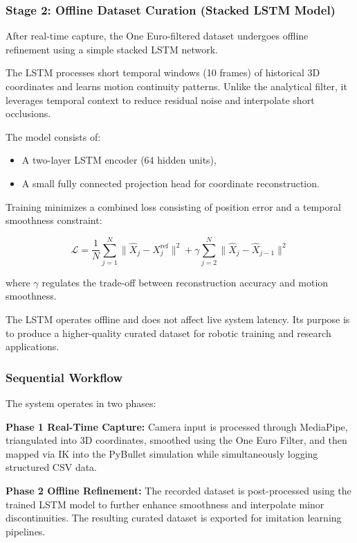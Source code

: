 \subsubsection{Stage 2: Offline Dataset Curation (Stacked LSTM Model)}

After real-time capture, the One Euro-filtered dataset undergoes 
offline refinement using a simple stacked LSTM network.

The LSTM processes short temporal windows (10 frames) of historical 
3D coordinates and learns motion continuity patterns. 
Unlike the analytical filter, it leverages temporal context to 
reduce residual noise and interpolate short occlusions.

The model consists of:
\begin{itemize}
    \item A two-layer LSTM encoder (64 hidden units),
    \item A small fully connected projection head for coordinate reconstruction.
\end{itemize}

Training minimizes a combined loss consisting of position error 
and a temporal smoothness constraint:

\begin{equation}
\mathcal{L} =
\frac{1}{N} \sum_{j=1}^{N} \|\hat{X}_j - X_j^{\text{ref}}\|^2
+
\gamma \sum_{j=2}^{N} \|\hat{X}_j - \hat{X}_{j-1}\|^2
\end{equation}

where $\gamma$ regulates the trade-off between reconstruction accuracy 
and motion smoothness.

The LSTM operates offline and does not affect live system latency. 
Its purpose is to produce a higher-quality curated dataset for 
robotic training and research applications.

\subsubsection{Sequential Workflow}

The system operates in two phases:

\textbf{Phase 1  Real-Time Capture:}  
Camera input is processed through MediaPipe, triangulated into 3D coordinates, 
smoothed using the One Euro Filter, and then mapped via IK into the PyBullet 
simulation while simultaneously logging structured CSV data.

\textbf{Phase 2  Offline Refinement:}  
The recorded dataset is post-processed using the trained LSTM model to 
further enhance smoothness and interpolate minor discontinuities. 
The resulting curated dataset is exported for imitation learning pipelines.

